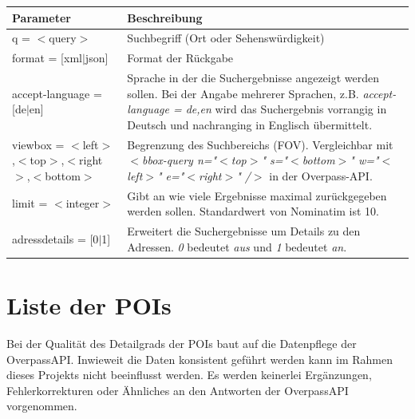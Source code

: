\documentclass[10pt]{scrreprt}
\newcommand{\JoglEarth}{\raisebox{-1.2mm}{\texttt{[image: Logo-Text.eps]}} }
\begin{document}
\begin{tabular}{|p{5cm}|p{11cm}|}
\hline
\rule[-1ex]{0pt}{4ex} \textbf{Parameter} & \textbf{Beschreibung} \\
\hline
\hline
\rule[-1ex]{0pt}{4ex} q = $<$query$>$ & Suchbegriff (Ort oder Sehenswürdigkeit) \\
\hline
\rule[-1ex]{0pt}{4ex} format = [xml$|$json] & Format der Rückgabe \\
\hline
\rule[-1ex]{0pt}{4ex} accept-language = [de$|$en] & Sprache in der die Suchergebnisse angezeigt werden sollen. Bei der Angabe mehrerer Sprachen, z.B. \textit{accept-language = de,en} wird das Suchergebnis vorrangig in Deutsch und nachranging in Englisch übermittelt. \\
\hline
\rule[-1ex]{0pt}{4ex} viewbox = $<$left$>$,$<$top$>$,$<$right$>$,$<$bottom$>$ & Begrenzung des Suchbereichs (FOV). Vergleichbar mit \textit{$<$bbox-query  n="{}$<$top$>$"{} s="{}$<$bottom$>$"{} w="{}$<$left$>$"{} e="{}$<$right$>$"{}  /$>$} in der Overpass-API. \\
\hline
\rule[-1ex]{0pt}{4ex} limit = $<$integer$>$ & Gibt an wie viele Ergebnisse maximal zurückgegeben werden sollen. Standardwert von Nominatim ist 10.\\
\hline
\rule[-1ex]{0pt}{4ex} adressdetails = [0$|$1] & Erweitert die Suchergebnisse um Details zu den Adressen. \textit{0} bedeutet \textit{aus} und \textit{1} bedeutet \textit{an}. \\
\hline
\end{tabular}


\newpage

\section{Liste der POIs}
Bei der Qualität des Detailgrads der POIs baut \JoglEarth auf die Datenpflege der OverpassAPI. Inwieweit die Daten konsistent geführt werden kann im Rahmen dieses Projekts nicht beeinflusst werden. Es werden keinerlei Ergänzungen, Fehlerkorrekturen oder Ähnliches an den  Antworten der OverpassAPI vorgenommen.\\

\vspace{5 mm}
\end{document}
